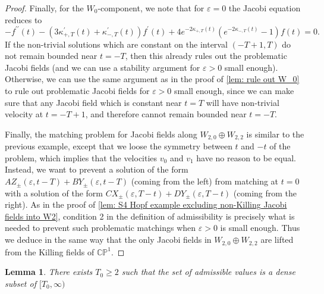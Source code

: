 \documentclass{article}
\numberwithin{equation}{section}        %
\theoremstyle{bfnote}
\newtheorem{lem}[thm]{Lemma}                %
\theoremstyle{definition}
\theoremstyle{bfremark}
\begin{document}
\begin{proof}
    Finally, for the $W_0$-component, we note that for $\varepsilon = 0$ the Jacobi equation reduces to
    \begin{equation*}
        - f^{\prime\prime}(t) - (3 \kappa^\prime_{+,T}(t) + \kappa^\prime_{-,T}(t))f^\prime(t) + 4e^{-2\kappa_{+,T}(t)} (e^{-2\kappa_{-,T}(t)}-1) f(t) = 0 .
    \end{equation*}
    If the non-trivial solutions which are constant on the interval $(-T+1,T)$ do not remain bounded near $t = -T$, then this already rules out the problematic Jacobi fields (and we can use a stability argument for $\varepsilon > 0$ small enough). Otherwise, we can use the same argument as in the proof of \cref{lem: rule out W_0} to rule out problematic Jacobi fields for $\varepsilon > 0$ small enough, since we can make sure that any Jacobi field which is constant near $t = T$ will have non-trivial velocity at $t = -T + 1$, and therefore cannot remain bounded near $t = -T$.

    Finally, the matching problem for Jacobi fields along $W_{2,0} \oplus W_{2,2}$ is similar to the previous example, except that we loose the symmetry between $t$ and $-t$ of the problem, which implies that the velocities $v_0$ and $v_1$ have no reason to be equal. Instead, we want to prevent a solution of the form $A Z_\pm(\varepsilon,t-T) + B Y_\pm(\varepsilon,t-T)$ (coming from the left) from matching at $t = 0$ with a solution of the form $CX_\pm(\varepsilon,T-t) + DY_\pm(\varepsilon,T-t)$ (coming from the right). As in the proof of \cref{lem: S4 Hopf example excluding non-Killing Jacobi fields into W2}, condition 2 in the definition of admissibility is precisely what is needed to prevent such problematic matchings when $\varepsilon > 0$ is small enough. Thus we deduce in the same way that the only Jacobi fields in $W_{2,0} \oplus W_{2,2}$ are lifted from the Killing fields of $\mathbb{CP}^1$.
\end{proof}

\begin{lem}
    There exists $T_0 \geq 2$ such that the set of admissible values is a dense subset of $[T_0,\infty)$
\end{lem}
\end{document}
